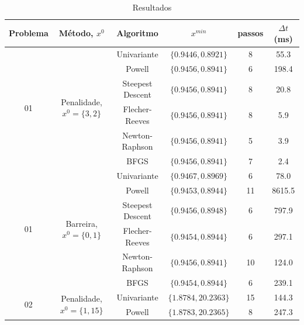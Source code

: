 \documentclass[10pt, a4paper]{article}
\begin{document}
\begin{table}[H]
      \small
      \centering
      \caption{Resultados}
      \begin{tabular}{c|c|c|c|c|c}
            Problema & M\'etodo, $x^0$  & Algoritmo & $x^{min}$ & passos & $\Delta t$(ms) \\
            \hline
            \multirow{6}{*}{01} & \multirow{6}{*}{Penalidade, $x^0=\{3,2\}$} & Univariante       & $\{0.9446,0.8921\}$ & 8 & 55.3  \\
                                                            & & Powell            & $\{0.9456,0.8941\}$ & 6 & 198.4 \\
                                                            & & Steepest Descent  & $\{0.9456,0.8941\}$ & 8 & 20.8  \\
                                                            & & Flecher-Reeves    & $\{0.9456,0.8941\}$ & 8 & 5.9   \\
                                                            & & Newton-Raphson    & $\{0.9456,0.8941\}$ & 5 & 3.9   \\
                                                            & & BFGS              & $\{0.9456,0.8941\}$ & 7 & 2.4   \\
            \hline
            \multirow{6}{*}{01} & \multirow{6}{*}{Barreira, $x^0=\{0,1\}$} & Univariante         & $\{0.9467,0.8969\}$ & 6  & 78.0   \\
                                                            & & Powell            & $\{0.9453,0.8944\}$ & 11 & 8615.5 \\
                                                            & & Steepest Descent  & $\{0.9456,0.8948\}$ & 6  & 797.9  \\
                                                            & & Flecher-Reeves    & $\{0.9454,0.8944\}$ & 6  & 297.1  \\
                                                            & & Newton-Raphson    & $\{0.9456,0.8941\}$ & 10 & 124.0  \\
                                                            & & BFGS              & $\{0.9454,0.8944\}$ & 6  & 239.1  \\
            \hline
            \multirow{6}{*}{02} & \multirow{6}{*}{Penalidade, $x^0=\{1,15\}$} & Univariante       & $\{1.8784,20.2363\}$ & 15 & 144.3   \\
                                                            & & Powell            & $\{1.8783,20.2365\}$ & 8  & 247.3   \\

\end{tabular}
\end{table}
\end{document}
